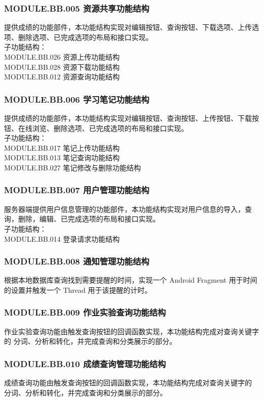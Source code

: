 \subsubsection{MODULE.BB.005    资源共享功能结构}
提供成绩的功能部件，本功能结构实现对编辑按钮、查询按钮、下载选项、上传选项、删除选项、已完成选项的布局和接口实现。
\\子功能结构：
\\MODULE.BB.026 资源上传功能结构
\\MODULE.BB.028 资源下载功能结构
\\MODULE.BB.012 资源查询功能结构

\subsubsection{MODULE.BB.006    学习笔记功能结构}
提供成绩的功能部件，本功能结构实现对编辑按钮、查询按钮、上传按钮、下载按钮、在线浏览、删除选项、已完成选项的布局和接口实现。
\\子功能结构：
\\MODULE.BB.017 笔记上传功能结构
\\MODULE.BB.013 笔记查询功能结构
\\MODULE.BB.027 笔记修改与删除功能结构

\subsubsection{MODULE.BB.007    用户管理功能结构}
服务器端提供用户信息管理的功能部件，本功能结构实现对用户信息的导入，查询，删除，编辑、已完成选项的布局和接口实现。
\\子功能结构：
\\MODULE.BB.014 登录请求功能结构

\subsubsection{MODULE.BB.008    通知管理功能结构}
根据本地数据库查询找到需要提醒的时间，实现一个 Android Fragment 用于时间的设置并触发一个 Thread 用于该提醒的计时。

\subsubsection{MODULE.BB.009    作业实验查询功能结构}
作业实验查询功能由触发查询按钮的回调函数实现，本功能结构完成对查询关键字的 分词、分析和转化，并完成查询和分类展示的部分。

\subsubsection{MODULE.BB.010    成绩查询管理功能结构}
成绩查询功能由触发查询按钮的回调函数实现，本功能结构完成对查询关键字的 分词、分析和转化，并完成查询和分类展示的部分。

